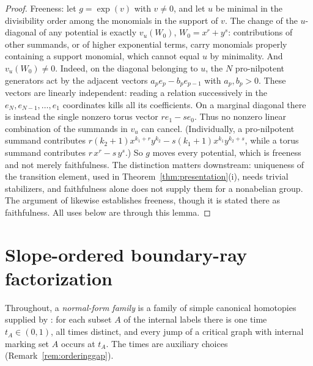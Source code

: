 \documentclass[11pt]{amsart}
\theoremstyle{definition}
\theoremstyle{remark}
\begin{document}
\begin{proof}
Freeness: let $g=\exp(v)$ with $v\ne0$, and let $u$ be minimal in the
divisibility order among the monomials in the support of $v$. The change of
the $u$-diagonal of any potential is exactly $v_{u}(W_{0})$, $W_{0}=x^{r}+y^{s}$: contributions of
other summands, or of higher exponential terms, carry monomials properly
containing a support monomial, which cannot equal $u$ by minimality. And
$v_{u}(W_{0})\ne0$. Indeed, on the diagonal belonging to $u$, the $N$
pro-nilpotent generators act by the adjacent vectors
$a_{p}e_{p}-b_{p}e_{p-1}$ with $a_{p},b_{p}>0$. These vectors are linearly
independent: reading a relation successively in the
$e_{N},e_{N-1},\ldots,e_{1}$ coordinates kills all its coefficients. On a
marginal diagonal there is instead the single nonzero torus vector
$r e_{1}-s e_{0}$. Thus no nonzero linear combination of the summands in
$v_u$ can cancel. (Individually, a pro-nilpotent summand contributes
$r(k_{2}{+}1)x^{k_{1}+r}y^{k_{2}}-s(k_{1}{+}1)x^{k_{1}}y^{k_{2}+s}$, while a
torus summand contributes $r\,x^{r}-s\,y^{s}$.) So $g$ moves every potential, which is freeness and not
merely faithfulness. The distinction matters downstream: uniqueness of the
transition element, used in Theorem~\ref{thm:presentation}(i), needs trivial
stabilizers, and faithfulness alone does not supply them for a nonabelian group.
The argument of \cite[Thm.~4.27, Step~2]{GKT} likewise establishes freeness,
though it is stated there as faithfulness. All uses below are through this lemma.
\end{proof}

\section{Slope-ordered boundary-ray factorization}
\label{sec:presentation}

Throughout, a \emph{normal-form family} is a family of simple canonical
homotopies supplied by \cite[Lem.~3.40]{GKT}: for each subset $A$ of the
internal labels there is one time $t_{A}\in(0,1)$, all times distinct, and
every jump of a critical graph with internal marking set $A$ occurs at
$t_{A}$. The times are auxiliary choices (Remark~\ref{rem:orderinggap}).
\end{document}
